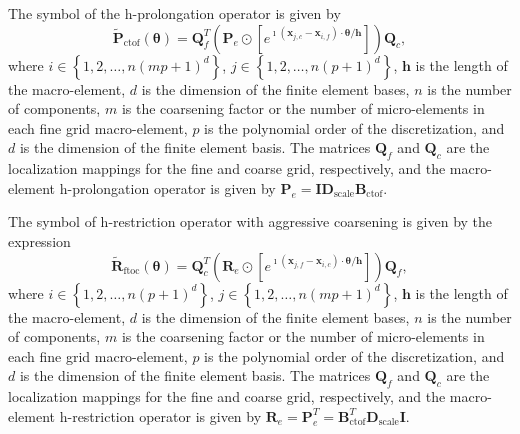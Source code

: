 \documentclass[review]{siamart190516}
\begin{document}
\begin{definition}\label{def:h_prolongation_symbol}
The symbol of the h-prolongation operator is given by
\begin{equation}
\tilde{\mathbf{P}}_{\text{ctof}} \left( \boldsymbol{\theta} \right) = \mathbf{Q}_f^T \left( \mathbf{P}_e \odot \left[ e^{\imath \left( \mathbf{x}_{j, c} - \mathbf{x}_{i, f} \right) \cdot \mathbf{\theta} / \mathbf{h}} \right] \right) \mathbf{Q}_c,
\end{equation}
where $i \in \left\lbrace 1, 2, \dots, n \left( m p + 1 \right)^d \right\rbrace$, $j \in \left\lbrace 1, 2, \dots, n \left( p + 1 \right)^d \right\rbrace$, $\mathbf{h}$ is the length of the macro-element, $d$ is the dimension of the finite element bases, $n$ is the number of components, $m$ is the coarsening factor or the number of micro-elements in each fine grid macro-element, $p$ is the polynomial order of the discretization, and $d$ is the dimension of the finite element basis.
The matrices $\mathbf{Q}_f$ and $\mathbf{Q}_c$ are the localization mappings for the fine and coarse grid, respectively, and the macro-element h-prolongation operator is given by $\mathbf{P}_e = \mathbf{I} \mathbf{D}_{\text{scale}} \mathbf{B}_{\text{ctof}}$.
\end{definition}

\begin{definition}\label{def:h_restriction_symbol}
The symbol of h-restriction operator with aggressive coarsening is given by the expression
\begin{equation}
\tilde{\mathbf{R}}_{\text{ftoc}} \left( \boldsymbol{\theta} \right) = \mathbf{Q}_c^T \left( \mathbf{R}_e \odot \left[ e^{\imath \left( \mathbf{x}_{j, f} - \mathbf{x}_{i, c} \right) \cdot \boldsymbol{\theta} / \mathbf{h}} \right] \right) \mathbf{Q}_f,
\end{equation}
where $i \in \left\lbrace 1, 2, \dots, n \left( p + 1 \right)^d \right\rbrace$, $j \in \left\lbrace 1, 2, \dots, n \left( m p + 1 \right)^d \right\rbrace$, $\mathbf{h}$ is the length of the macro-element, $d$ is the dimension of the finite element bases, $n$ is the number of components, $m$ is the coarsening factor or  the number of micro-elements in each fine grid macro-element, $p$ is the polynomial order of the discretization, and $d$ is the dimension of the finite element basis.
The matrices $\mathbf{Q}_f$ and $\mathbf{Q}_c$ are the localization mappings for the fine and coarse grid, respectively, and the macro-element h-restriction operator is given by $\mathbf{R}_e = \mathbf{P}_e^T = \mathbf{B}_{\text{ctof}}^T \mathbf{D}_{\text{scale}} \mathbf{I}$.
\end{definition}
\end{document}

